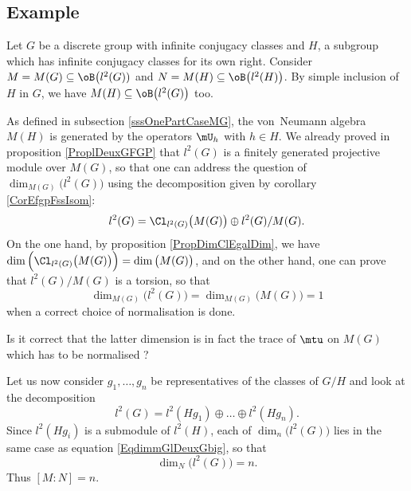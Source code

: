 					\subsection{Example}


Let $G$ be a discrete group with infinite conjugacy classes and $H$, a subgroup which has infinite conjugacy classes for its own right. Consider $M=M(G)\subseteq\oB\big(l^2(G))$ and $N=M(H)\subseteq\oB\big( l^2(H) \big)$. By simple inclusion of $H$ in $G$, we have $M(H)\subseteq\oB\big( l^2(G) \big)$ too.

As defined in subsection \ref{sssOnePartCaseMG}, the von~Neumann algebra $M(H)$ is generated by the operators $\mU_h$ with $h\in H$. We already proved in proposition \ref{ProplDeuxGFGP}\label{PglDeuxGFGPutiliseIci} that $l^2(G)$ is a finitely generated projective module over $M(G)$, so that one can address the question of $\dim_{M(G)}\big( l^2(G) \big)$ using the decomposition given by corollary \ref{CorEfgpFssIsom}:
\begin{equation}
	l^2(G)=\Cl_{l^2(G)}\big( M(G) \big)\oplus l^2(G)/M(G).
\end{equation}
On the one hand, by proposition \ref{PropDimClEgalDim}, we have $\dim\Big( \Cl_{l^2(G)}\big( M(G) \big) \Big)=\dim\big( M(G) \big)$, and on the other hand, one can prove that $l^2(G)/M(G)$ is a torsion, so that
\begin{equation}		\label{EqdimmGlDeuxGbig}
	\dim_{M(G)}\big( l^2(G) \big)=\dim_{M(G)}\big( M(G) \big)=1
\end{equation}
when a correct choice of normalisation is done.

\begin{probleme}
Is it correct that the latter dimension is in fact the trace of $\mtu$ on $M(G)$ which has to be normalised ?
\end{probleme}

Let us now consider $g_1,\ldots,g_n$ be representatives of the classes of $G/H$ and look at the decomposition
\begin{equation}
	l^2(G)=l^2(Hg_1)\oplus\ldots\oplus l^2(Hg_n).
\end{equation}
Since $l^2(Hg_i)$ is a submodule of $l^2(H)$, each of $\dim_n\big( l^2(G) \big)$ lies in the same case as equation \eqref{EqdimmGlDeuxGbig}, so that
\begin{equation}
	\dim_N\big( l^2(G) \big)=n.
\end{equation}
Thus $[M:N]=n$.


